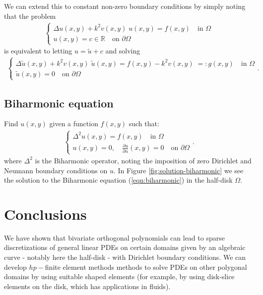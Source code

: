 \documentclass[11pt, oneside]{article}   	%
\newcommand{\R}{\mathbb{R}}
\begin{document}
We can extend this to constant non-zero boundary conditions by simply noting that the problem 
\begin{align*}
	\begin{cases}
    		\Delta u(x,y) + k^2 v(x,y) \; u(x,y) = f(x,y) \quad \text{in } \Omega \\
		u(x,y) = c \in \R \quad \text{on } \partial \Omega
	\end{cases}
\end{align*}
is equivalent to letting $u = \tilde{u} + c$ and solving
\begin{align*}
	\begin{cases}
    		\Delta \tilde{u}(x,y) + k^2 v(x,y) \; \tilde{u}(x,y) = f(x,y) - k^2 v(x,y) \; =: g(x,y)  \quad \text{in } \Omega \\
		\tilde{u}(x,y) = 0 \quad \text{on } \partial \Omega
	\end{cases}.
\end{align*}


\subsection{Biharmonic equation}

Find \(u(x,y)\) given a function \(f(x,y)\) such that:
\begin{align}
	\begin{cases}
    		\Delta^2 u(x,y) = f(x,y) \quad \text{in } \Omega \\
		u(x,y) = 0, \quad \frac{\partial u}{\partial n}(x,y) = 0 \quad \text{on } \partial \Omega
	\end{cases}.
	\label{eqn:biharmonic}
\end{align}
where $\Delta^2$ is the Biharmonic operator, noting the imposition of zero Dirichlet and Neumann boundary conditions on $u$. In Figure \ref{fig:solution-biharmonic} we see the solution to the Biharmonic equation (\ref{eqn:biharmonic}) in the half-disk $\Omega$.



%
\section{Conclusions}

We have shown that bivariate orthogonal polynomials can lead to sparse discretizations of general linear PDEs on certain domains given by an algebraic curve - notably here the half-disk - with Dirichlet boundary conditions. We can develop $hp-$finite element methods methods to solve PDEs on other polygonal domains by using suitable shaped elements (for example, by using disk-slice elements on the disk, which has applications in fluids). 
\end{document}
